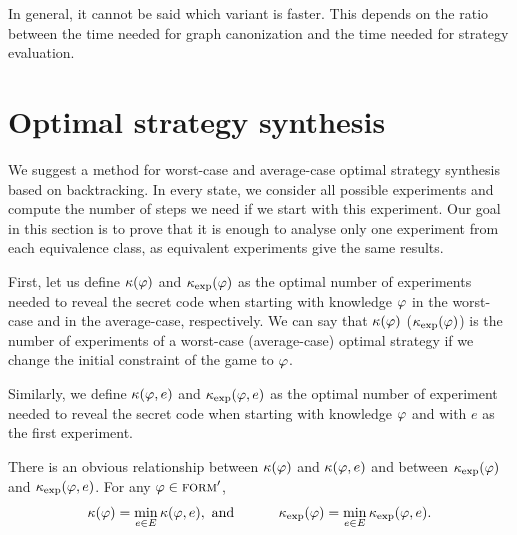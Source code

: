 In general, it cannot be said which variant is faster.
This depends on the ratio between the time
  needed for graph canonization and the
  time needed for strategy evaluation.

\section{Optimal strategy synthesis}

We suggest a method for worst-case and average-case
  optimal strategy synthesis based on backtracking.
In every state, we consider all possible experiments
  and compute the number of steps we need if we start with
  this experiment.
Our goal in this section is to prove that
  it is enough to analyse only one experiment from each equivalence class,
  as equivalent experiments give the same results.

\newcommand{\optval}{\kappa}
\newcommand{\optexp}{\varepsilon}
\newcommand{\optvale}{\kappa_\textrm{exp}}
\newcommand{\optexpe}{\varepsilon_\textrm{exp}}

First, let us define $\optval(\form)$ and $\optvale(\form)$ as
 the optimal number of experiments needed to reveal the secret code
  when starting with knowledge $\varphi$
  in the worst-case and in the average-case, respectively.
We can say that $\optval(\form)$ ($\optvale(\form)$) is
  the number of experiments of
  a worst-case (average-case) optimal strategy
  if we change the initial constraint of the game to $\varphi$.

Similarly, we define $\optval(\form, e)$ and $\optvale(\form, e)$ as
  the optimal number of experiment needed to reveal the secret code
  when starting with knowledge $\varphi$ and
  with $e$ as the first experiment.

There is an obvious relationship between $\optval(\form)$ and $\optval(\form,e)$
  and between $\optvale(\form)$ and $\optvale(\form,e)$.
For any $\varphi\in{\textsc{form}'}$,
\begin{equation}
\optval(\form) = \min_{e\in\Exp}\optval(\form, e),\textrm{ and }
\hspace{1cm}
\optvale(\form) = \min_{e\in\Exp}\optvale(\form, e).
\label{opttriv}
\end{equation}

